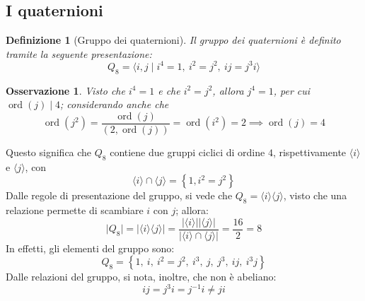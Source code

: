 \documentclass[12pt]{scrartcl}
\theoremstyle{style}
\newtheorem{definizione}{Definizione}[section]
\newtheorem{osservazione}{Osservazione}[section]
\numberwithin{equation}{subsection}
\begin{document}
\subsection{I quaternioni}
\begin{definizione}
	[Gruppo dei quaternioni]
Il gruppo dei quaternioni \`e definito tramite la seguente presentazione:
\begin{equation*}
	Q_8 = \langle i,j  \mid i^4 = 1 , \ i^2 = j^2 , \ ij = j^3 i  \rangle
\end{equation*}
\end{definizione}
\begin{osservazione}
Visto che $i^4 = 1$ e che $i^2 = j^2$, allora $j^4 = 1$, per cui $\operatorname{ord}(j)  \mid 4$; considerando anche che
\[
\operatorname{ord}(j^2) = \frac{\operatorname{ord}(j) }{(2,\operatorname{ord}(j) )} = \operatorname{ord}(i^2)  = 2 \implies \operatorname{ord}(j) = 4
\] 
\end{osservazione}
\noindent Questo significa che $Q_8$ contiene due gruppi ciclici di ordine $4$, rispettivamente $\langle i \rangle$ e $ \langle j \rangle$, con 
\[
\langle i \rangle\cap \langle j \rangle = \left\{ 1 , i^2 = j^2 \right\} 
\] 
Dalle regole di presentazione del gruppo, si vede che $Q_8 = \langle i \rangle\langle j \rangle$, visto che una relazione permette di scambiare $i$ con $j$; allora:
\[
\lvert Q_8 \rvert  = \lvert \langle i \rangle\langle j \rangle \rvert = \frac{\lvert \langle i \rangle \rvert \lvert \langle j \rangle \rvert }{\lvert \langle i \rangle\cap \langle j \rangle \rvert } = \frac{16}{2}=8
\] 
In effetti, gli elementi del gruppo sono:
\[
Q_8 = \left\{ 1 ,\ i ,\ i ^2 = j^2 ,\ i^3 ,\ j,\ j^3,\ ij,\ i^3j \right\} 
\] 
Dalle relazioni del gruppo, si nota, inoltre, che non \`e abeliano:
\[
ij = j^3 i = j^{-1}i\neq ji
\] 
\end{document}
